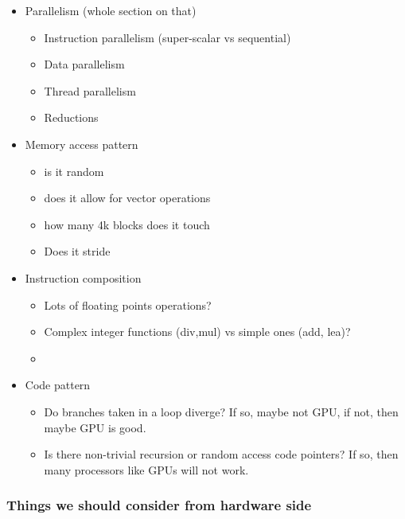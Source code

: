 \documentclass[12pt,twoside]{reedthesis}
\begin{document}
	
	\begin{itemize}
		\item Parallelism  (whole section on that)
			\begin{itemize} 
			\item Instruction parallelism (super-scalar vs sequential)
			\item Data parallelism 
			\item Thread parallelism
			\item Reductions
			\end{itemize} 
		
		\item Memory access pattern 
			\begin{itemize} 
			\item is it random
			\item does it allow for vector operations
			\item how many 4k blocks does it touch
			\item Does it stride
			\end{itemize} 
			
		\item Instruction composition
			\begin{itemize} 
			\item Lots of floating points operations?
			\item Complex integer functions (div,mul) vs simple ones (add, lea)?
			\item  
			\end{itemize} 
			
		\item Code pattern
			\begin{itemize} 
			\item Do branches taken in a loop diverge? If so, maybe not GPU, if not, then maybe GPU is good. 
			\item Is there non-trivial recursion or random access code pointers? If so, then many processors like GPUs will not work. 
			\end{itemize} 
		
	\end{itemize}
	
	
	\subsubsection{Things we should consider from hardware side}
	
\end{document}
